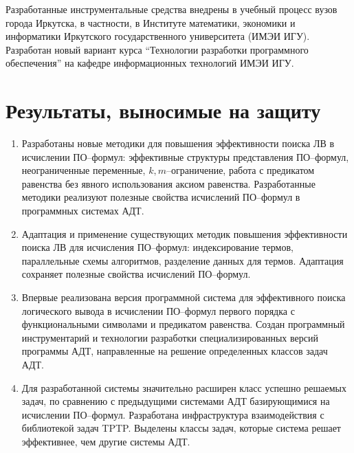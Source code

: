 Разработанные инструментальные средства внедрены в учебный процесс вузов города Иркутска, в частности, в Институте математики, экономики и информатики Иркутского государственного университета (ИМЭИ ИГУ). Разработан новый вариант курса ``Технологии разработки программного обеспечения'' на кафедре информационных технологий ИМЭИ ИГУ.



\section*{Результаты, выносимые на защиту}
\begin{enumerate}

\item Разработаны новые методики для повышения эффективности поиска ЛВ в исчислении ПО--формул: эффективные структуры представления ПО--формул,  неограниченные переменные, $k,m$--ограничение, работа с предикатом равенства без явного использования аксиом равенства. Разработанные методики реализуют полезные свойства исчислений ПО--формул в программных системах АДТ.

\item Адаптация и применение существующих методик повышения эффективности поиска ЛВ для исчисления ПО--формул: индексирование термов, параллельные схемы алгоритмов, разделение данных для термов. Адаптация сохраняет полезные свойства исчислений ПО--формул.

\item Впервые реализована версия программной система для эффективного поиска логического вывода в исчислении ПО--формул первого порядка с функциональными символами и предикатом равенства. Создан программный инструментарий и технологии разработки специализированных версий программы АДТ, направленные на решение определенных классов задач АДТ.

\item Для разработанной системы значительно расширен класс успешно решаемых задач, по сравнению с предыдущими системами АДТ базирующимися на исчислении ПО--формул. Разработана инфраструктура взаимодействия с библиотекой задач TPTP. Выделены классы задач, которые система решает эффективнее, чем другие системы АДТ.
\end{enumerate}



